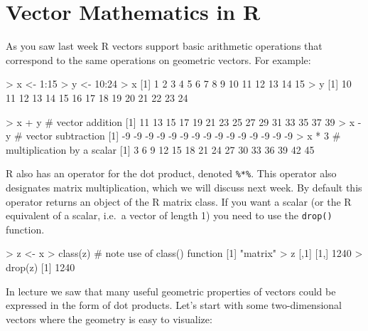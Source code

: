 
\section{Vector Mathematics in R}

As you saw last week R vectors support basic arithmetic operations that
correspond to the same operations on geometric vectors. For example:
%
\begin{R}
> x <- 1:15
> y <- 10:24
> x
 [1]  1  2  3  4  5  6  7  8  9 10 11 12 13 14 15
> y
 [1] 10 11 12 13 14 15 16 17 18 19 20 21 22 23 24

> x + y             # vector addition
 [1] 11 13 15 17 19 21 23 25 27 29 31 33 35 37 39
> x - y             # vector subtraction
 [1] -9 -9 -9 -9 -9 -9 -9 -9 -9 -9 -9 -9 -9 -9 -9
> x * 3             # multiplication by a scalar
 [1]  3  6  9 12 15 18 21 24 27 30 33 36 39 42 45
\end{R}
%
R also has an operator for the dot product, denoted \lstinline!%*%!.
This operator also designates matrix multiplication, which we will
discuss next week. By default this operator returns an object of the R
matrix class. If you want a scalar (or the R equivalent of a scalar,
i.e.~a vector of length 1) you need to use the \lstinline!drop()!
function.

\begin{R}
> z <- x %
> class(z)      # note use of class() function
[1] "matrix"
> z
     [,1]
[1,] 1240
> drop(z)
[1] 1240
\end{R}

In lecture we saw that many useful geometric properties of vectors could be expressed in the form of dot products. Let's start with some two-dimensional vectors where the geometry is  easy to visualize:

